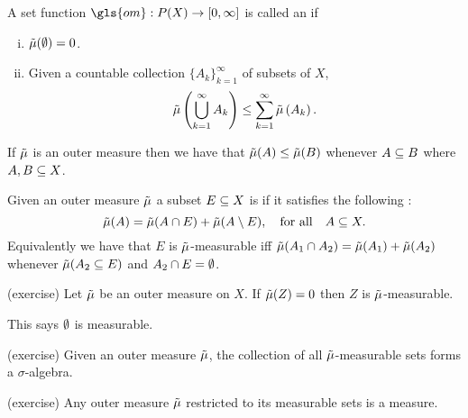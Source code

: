 \begin{defn}
  A set function $\gls{om}:P(X)\to [0,\infty]$ is called an  if
  \begin{enumerate}[(i)]
    \item $\tilde{\mu}(\emptyset) = 0$.
    \item Given a countable collection
      $\{A_k\}_{k=1}^\infty$ of subsets of $X$,
      \begin{equation*}
        \tilde{\mu}\left(\bigcup_{k=1}^\infty A_k\right)\le \sum_{k=1}^\infty
        \tilde{\mu}\left(A_k\right).
      \end{equation*}
  \end{enumerate}
\end{defn}

\begin{remark}
If $\tilde{\mu}$ is an outer measure then we have that $\tilde{\mu}(A)\le \tilde{\mu}(B)$
whenever $A\subseteq B$ where $A,B\subseteq X$.
\end{remark}

\begin{defn}
  Given an outer measure $\tilde{\mu}$ a subset $E\subseteq X$ is
   if it satisfies the following
  : 
  \begin{equation}
   \tilde{\mu}(A) = \tilde{\mu}(A\cap E)+\tilde{\mu}(A\setminus E), \quad\text{for all}\quad A\subseteq X.
  \end{equation}
  Equivalently we have that $E$ is $\tilde{\mu}$-measurable iff
  $\tilde{\mu}(A_1\cap A_2) = \tilde{\mu}(A_1)+\tilde{\mu}(A_2)$ whenever $\tilde{\mu}(A_2\subseteq E)$ and
  $A_2\cap E=\emptyset$.
\end{defn}

\begin{prop}(exercise)
  Let $\tilde{\mu}$ be an outer measure on $X$. If $\tilde{\mu}(Z) = 0$ then $Z$ is
  $\tilde{\mu}$-measurable.
\end{prop}

\begin{note}
  This says $\emptyset$ is measurable.  
\end{note}

\begin{prop}
  (exercise) Given an outer measure $\tilde{\mu}$, the collection of all
  $\tilde{\mu}$-measurable sets forms a $\sigma$-algebra.
\end{prop}

\begin{prop}(exercise)
  Any outer measure $\tilde{\mu}$ restricted to its measurable sets is a
  measure.
\end{prop}

